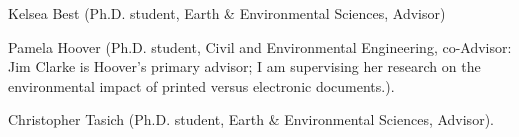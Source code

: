 \item Kelsea Best (Ph.D. student, Earth \& Environmental Sciences, Advisor)
\item Pamela Hoover (Ph.D. student, Civil and Environmental Engineering, co-Advisor: Jim Clarke is Hoover's primary advisor; I am supervising her research on the environmental impact of printed versus electronic documents.).
\item Christopher Tasich (Ph.D. student, Earth \& Environmental Sciences, Advisor).
